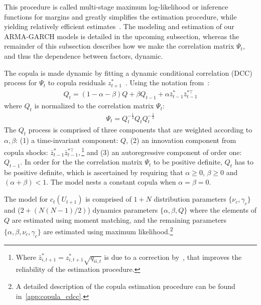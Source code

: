 This procedure is called multi-stage maximum log-likelihood or inference functions for margins and greatly simplifies the estimation procedure, while yielding relatively efficient estimates~\autocite{Patton2006,Joe1997}. The modeling and estimation of our ARMA-GARCH models is detailed in the upcoming subsection, whereas the remainder of this subsection describes how we make the correlation matrix $\Psi_t$, and thus the dependence between factors, dynamic.

The copula is made dynamic by fitting a dynamic conditional correlation (DCC) process for $\Psi_t$ to copula residuals $z_{t+1}^*$~\autocite{Engle2002}. Using the notation from~\textcite{ChristoffersenLanglois2013}:
\begin{align}
  Q_t = (1 - \alpha - \beta) Q
    + \beta Q_{t-1}
    + \alpha \bar{z}_{t-1}^* \bar{z}_{t-1}^{*\top}
  \label{eq:copula_cdcc}
\end{align}
where $Q_t$ is normalized to the correlation matrix $\Psi_t$:
\begin{align}
  \Psi_t = Q_t^{-\frac{1}{2}} Q_t Q_t^{-\frac{1}{2}}
  \label{eq:copula_cdcc_psi}
\end{align}
The $Q_t$ process is comprised of three components that are weighted according to $\alpha, \beta$: (1) a time-invariant component: $Q$, (2) an innovation component from copula shocks: $\bar{z}_{t-1}^{*} \bar{z}_{t-1}^{*\top},$\footnote{Where $\bar{z}_{i,t+1}^* = z_{i,t+1}^* \sqrt{q_{ii,t}}$ is due to a correction by~\textcite{Aielli2013}, that improves the reliability of the estimation procedure.} and (3) an autoregressive component of order one: $Q_{t-1}$. In order for the the correlation matrix $\Psi_t$ to be positive definite, $Q_t$ has to be positive definite, which is ascertained by requiring that $\alpha \geq 0$, $\beta \geq 0$ and $(\alpha + \beta) < 1$. The model nests a constant copula when $\alpha = \beta = 0$.

The model for $c_t(U_{t+1})$ is comprised of $1 + N$ distribution parameters $\{\nu_c, \gamma_c\}$ and (${2 + (N(N-1) / 2)}$) dynamics parameters $\{\alpha, \beta, Q\}$ where the elements of $Q$ are estimated using moment matching, and the remaining parameters $\{\alpha, \beta, \nu_c, \gamma_c\}$ are estimated using maximum likelihood.\footnote{A detailed description of the copula estimation procedure can be found in~\autoref{app:copula_cdcc}.}

